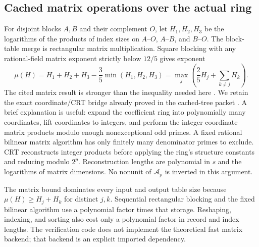 \subsection{Cached matrix operations over the actual ring}
For disjoint blocks $A,B$ and their complement $O$, let $H_1,H_2,H_3$
be the logarithms of the products of index sizes on $A$--$O$,
$A$--$B$, and $B$--$O$. The block-table merge is rectangular matrix
multiplication. Square blocking with any rational-field matrix exponent
strictly below $12/5$ gives exponent
\begin{equation}\label{eq:matrix}
 \mu(H)=H_1+H_2+H_3-\frac35\min(H_1,H_2,H_3)
 =\max_j\left(\frac25H_j+\sum_{k\ne j}H_k\right).
\end{equation}
The cited matrix result is stronger than the inequality needed here
\cite{matrix}. We retain the exact coordinate/CRT bridge already proved
in the cached-tree packet \cite{cachedtree}. A brief explanation is useful:
expand the coefficient ring into polynomially many coordinates, lift
coordinates to integers, and perform the integer coordinate matrix products
modulo enough nonexceptional odd primes. A fixed rational bilinear matrix
algorithm has only finitely many denominator primes to exclude. CRT
reconstructs integer products before applying the ring's structure constants
and reducing modulo $2^p$. Reconstruction lengths are polynomial in $s$
and the logarithms of matrix dimensions. No nonunit of $\mathcal A_p$ is
inverted in this argument.

The matrix bound dominates every input and output table size because
$\mu(H)\ge H_j+H_k$ for distinct $j,k$. Sequential rectangular blocking
and the fixed bilinear algorithm use a polynomial factor times that
storage. Reshaping, indexing, and sorting also cost only a polynomial
factor in record and index lengths. The verification code does not
implement the theoretical fast matrix backend; that backend is an
explicit imported dependency.
